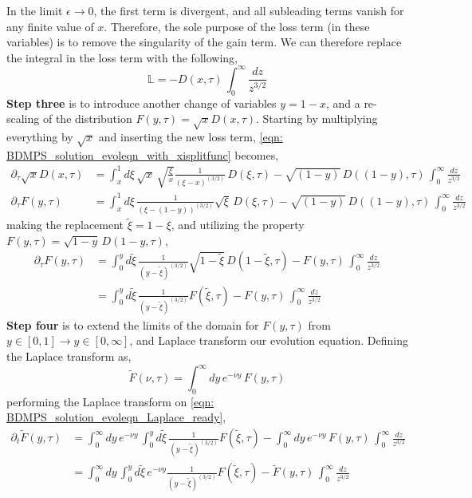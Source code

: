 \documentclass[main.tex]{subfiles}
\begin{document}
In the limit \(\epsilon \rightarrow 0\), the first term is divergent, and all subleading terms vanish for any finite value of \(x\). Therefore, the sole purpose of the loss term (in these variables) is to remove the singularity of the gain term.  We can therefore replace the integral in the loss term with the following, 
\begin{equation}
    \mathbb{L} = - D(x,\tau) \, \int_0^\infty \frac{dz}{z^{3/2}}
\end{equation}
\textbf{Step three} is to introduce another change of variables \(y = 1-x\), and a re-scaling of the distribution \(F(y, \tau ) = \sqrt{x} D(x,\tau)\). Starting by multiplying everything by \(\sqrt{x}\) and inserting the new loss term, \autoref{eqn: BDMPS_solution_evoleqn_with_xisplitfunc} becomes,
\begin{align}\label{eqn: BDMPS_solution_evoleqn_with_F(y,tau)}
    \partial_\tau \sqrt{x} D(x,\tau) &= \int_x^1 d\xi \,\sqrt{x}\, \sqrt{\frac{\xi}{x}} \frac{1}{(\xi-x)^{(3/2)}} \,D(\xi, \tau) - \sqrt{(1-y)}\, D((1-y),\tau) \, \int_0^\infty \frac{dz}{z^{3/2}} \nonumber \\
    \partial_\tau F(y,\tau) &= \int_x^1 d\xi \, \frac{1}{(\xi-(1-y))^{(3/2)}} \sqrt{\xi} \,D(\xi, \tau) - \sqrt{(1-y)}\, D((1-y),\tau) \, \int_0^\infty \frac{dz}{z^{3/2}}
\end{align}
making the replacement \(\tilde{\xi}  = 1- \xi\), and utilizing the property \(F(y, \tau ) = \sqrt{1-y} \,D(1-y,\tau)\),
\begin{align}\label{eqn: BDMPS_solution_evoleqn_Laplace_ready}
    \partial_\tau F(y,\tau) &= \int_0^{y} d\tilde{\xi} \, \frac{1}{(y-\tilde{\xi})^{(3/2)}} \sqrt{1-\tilde{\xi}} \,D(1-\tilde{\xi}, \tau) - F(y,\tau) \, \int_0^\infty \frac{dz}{z^{3/2}} \nonumber \\
    &= \int_0^{y} d\tilde{\xi} \, \frac{1}{(y-\tilde{\xi})^{(3/2)}} F(\tilde{\xi}, \tau) - F(y,\tau) \, \int_0^\infty \frac{dz}{z^{3/2}}
\end{align}
\textbf{Step four} is to extend the limits of the domain for \(F(y,\tau)\) from \(y\in[0,1] \rightarrow y \in [0, \infty]\), and Laplace transform our evolution equation. Defining the Laplace transform as, 
\begin{equation}\label{eqn: BDMPS_solution_Laplace_definition}
    \tilde{F}(\nu, \tau) = \int_0^\infty dy \, e^{-\nu y}\, F(y,\tau)
\end{equation}
performing the Laplace transform on \autoref{eqn: BDMPS_solution_evoleqn_Laplace_ready},
\begin{align}\label{eqn: BDMPS_solution_laplace_step1}
    \partial_t \tilde{F}(y,\tau) &= \int_0^\infty dy\, e^{-\nu y}\,  \int_0^{y} d\tilde{\xi} \, \frac{1}{(y-\tilde{\xi})^{(3/2)}} F(\tilde{\xi}, \tau) - \int_0^\infty dy \, e^{-\nu y}\, F(y,\tau) \, \int_0^\infty \frac{dz}{z^{3/2}} \nonumber \\
    &= \int_0^\infty dy\, \int_0^{y} d\tilde{\xi} \, e^{-\nu y} \frac{1}{(y-\tilde{\xi})^{(3/2)}} F(\tilde{\xi}, \tau) - \tilde{F}(y,\tau) \, \int_0^\infty \frac{dz}{z^{3/2}}
\end{align}
\end{document}
